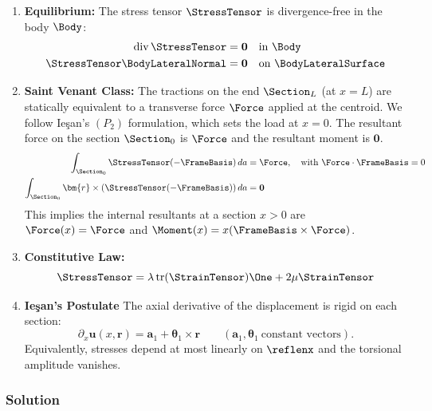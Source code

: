 \begin{enumerate}
    \item \textbf{Equilibrium:} The stress tensor $\StressTensor$ is divergence-free in the body $\Body$:
    \begin{align*}
        \operatorname{div} \StressTensor &= \mathbf{0} \quad \text{in } \Body \\
        \StressTensor \BodyLateralNormal &= \mathbf{0} \quad \text{on } \BodyLateralSurface
    \end{align*}
    
    \item \textbf{Saint Venant Class:} The tractions on the end $\Section_L$ (at $x=L$) are statically equivalent to a transverse force $\Force$ applied at the centroid. We follow Ie\c{s}an's $(P_2)$ formulation, which sets the load at $x=0$. The resultant force on the section $\Section_0$ is $\Force$ and the resultant moment is $\mathbf{0}$.
    \begin{align}
        \int_{\Section_0} \StressTensor (-\FrameBasis) \, da &= \Force, \quad \text{with } \Force \cdot \FrameBasis = 0 \\
        \int_{\Section_0} \bm{r} \times (\StressTensor (-\FrameBasis)) \, da &= \mathbf{0} 
    \end{align}
    This implies the internal resultants at a section $x > 0$ are $\Force(x) = \Force$ and $\Moment(x) = x (\FrameBasis \times \Force)$.

    \item \textbf{Constitutive Law:}
    \begin{equation}
        \StressTensor = \lambda \operatorname{tr}(\StrainTensor) \One + 2\mu \StrainTensor
    \end{equation}

    \item \textbf{Ie\c{s}an's Postulate}
    The axial derivative of the displacement is rigid on each section:
    \begin{equation}
    \partial_x \bm{u}(x,\bm{r})=\bm{a}_1+\bm{\theta}_1\times\bm{r}\qquad(\bm{a}_1,\bm{\theta}_1\ \text{constant vectors}).
    \label{eq:iesan-postulate-2}
    \end{equation}
    Equivalently, stresses depend at most linearly on $\reflenx$ and the torsional amplitude vanishes.
\end{enumerate}

\subsubsection{Solution}

